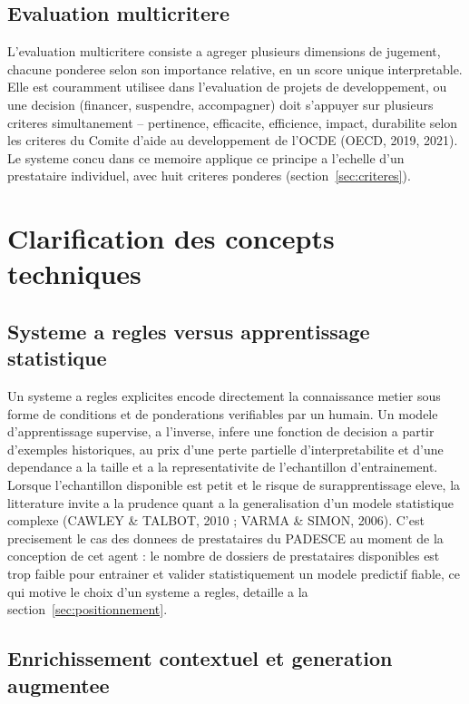 \documentclass[12pt,a4paper,twoside,openany]{report}
\begin{document}
\subsection{Evaluation multicritere}

L'evaluation multicritere consiste a agreger plusieurs dimensions de jugement, chacune ponderee selon son importance relative, en un score unique interpretable. Elle est couramment utilisee dans l'evaluation de projets de developpement, ou une decision (financer, suspendre, accompagner) doit s'appuyer sur plusieurs criteres simultanement -- pertinence, efficacite, efficience, impact, durabilite selon les criteres du Comite d'aide au developpement de l'OCDE (OECD, 2019, 2021). Le systeme concu dans ce memoire applique ce principe a l'echelle d'un prestataire individuel, avec huit criteres ponderes (section~\ref{sec:criteres}).

\section{Clarification des concepts techniques}

\subsection{Systeme a regles versus apprentissage statistique}

Un systeme a regles explicites encode directement la connaissance metier sous forme de conditions et de ponderations verifiables par un humain. Un modele d'apprentissage supervise, a l'inverse, infere une fonction de decision a partir d'exemples historiques, au prix d'une perte partielle d'interpretabilite et d'une dependance a la taille et a la representativite de l'echantillon d'entrainement. Lorsque l'echantillon disponible est petit et le risque de surapprentissage eleve, la litterature invite a la prudence quant a la generalisation d'un modele statistique complexe (CAWLEY \& TALBOT, 2010 ; VARMA \& SIMON, 2006). C'est precisement le cas des donnees de prestataires du PADESCE au moment de la conception de cet agent : le nombre de dossiers de prestataires disponibles est trop faible pour entrainer et valider statistiquement un modele predictif fiable, ce qui motive le choix d'un systeme a regles, detaille a la section~\ref{sec:positionnement}.

\subsection{Enrichissement contextuel et generation augmentee}
\end{document}
